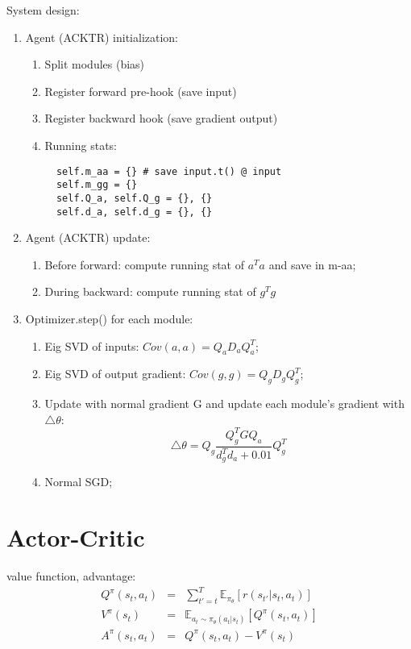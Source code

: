 \documentclass{article}
\begin{document}
System design:
\begin{enumerate}
\item Agent (ACKTR) initialization:
  \begin{enumerate}
  \item Split modules (bias)
  \item Register forward pre-hook (save input)
  \item Register backward hook (save gradient output)
  \item Running stats:
  \begin{verbatim}
  self.m_aa = {} # save input.t() @ input
  self.m_gg = {}
  self.Q_a, self.Q_g = {}, {}
  self.d_a, self.d_g = {}, {}
  \end{verbatim}
  \end{enumerate}
\item Agent (ACKTR) update:
  \begin{enumerate}
  \item Before forward: compute running stat of $a^Ta$ and save in m-aa;
  \item During backward: compute running stat of $g^Tg$
  \end{enumerate}
\item Optimizer.step() for each module:
  \begin{enumerate}
  \item Eig SVD of inputs: $Cov(a,a) = Q_a D_a Q_a^T$;
  \item Eig SVD of output gradient: $Cov(g,g) = Q_g D_g Q_g^T$;
  \item Update with normal gradient G and update each module's gradient with $\triangle\theta$: 
  \begin{equation}
  \triangle\theta = Q_g \frac{Q_g^T G Q_a}{d_g^Td_a+0.01} Q_g^T
  \end{equation}
  \item Normal SGD;
  \end{enumerate}
\end{enumerate}

\section{Actor-Critic}
value function, advantage:
\begin{eqnarray*}
Q^{\pi}(s_t, a_t)&=&\sum_{t'=t}^T \mathbb{E}_{\pi_{\theta}}[r(s_{t'}|s_t,a_t)]\\
V^{\pi}(s_t)&=& \mathbb{E}_{a_t\sim\pi_{\theta}(a_t|s_t)}[Q^{\pi}(s_t,a_t)]\\
A^{\pi}(s_t, a_t) &=& Q^{\pi}(s_t, a_t) - V^{\pi}(s_t)
\end{eqnarray*}
\end{document}
